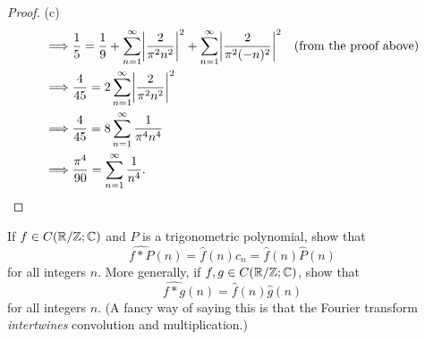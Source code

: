 \begin{proof}{(c)}
\begin{align*}
    \implies & \dfrac{1}{5} = \dfrac{1}{9} + \sum_{n = 1}^\infty \abs{\dfrac{2}{\pi^2 n^2}}^2 + \sum_{n = 1}^\infty \abs{\dfrac{2}{\pi^2 (-n)^2}}^2 &  & \text{(from the proof above)} \\
    \implies & \dfrac{4}{45} = 2 \sum_{n = 1}^\infty \abs{\dfrac{2}{\pi^2 n^2}}^2                                                                                                      \\
    \implies & \dfrac{4}{45} = 8 \sum_{n = 1}^\infty \dfrac{1}{\pi^4 n^4}                                                                                                              \\
    \implies & \dfrac{\pi^4}{90} = \sum_{n = 1}^\infty \dfrac{1}{n^4}.
  \end{align*}
\end{proof}

\begin{ex}\label{ex:5.5.3}
  If \(f \in C(\mathbb{R} / \mathbb{Z} ; \mathbb{C})\) and \(P\) is a trigonometric polynomial, show that
  \[
    \widehat{f * P}(n) = \hat{f}(n) c_n = \hat{f}(n) \hat{P}(n)
  \]
  for all integers \(n\).
  More generally, if \(f, g \in C(\mathbb{R} / \mathbb{Z} ; \mathbb{C})\), show that
  \[
    \widehat{f * g}(n) = \hat{f}(n) \hat{g}(n)
  \]
  for all integers \(n\).
  (A fancy way of saying this is that the Fourier transform \emph{intertwines} convolution and multiplication.)
\end{ex}

